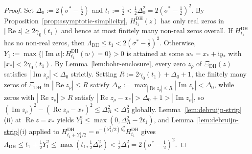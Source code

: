 \documentclass[11pt,a4paper,reqno]{amsart}
\theoremstyle{definition}
\theoremstyle{remark}
\numberwithin{equation}{section}
\newcommand{\ii}{\mathrm{i}}
\newcommand{\ee}{\mathrm{e}}
\DeclareMathOperator{\Reop}{Re}
\DeclareMathOperator{\Imop}{Im}
\begin{document}
\begin{proof}
Set $\Delta_0 := 2(\sigma^* - \frac{1}{2})$ and $t_1 := \frac{1}{2} < \frac{1}{2}\Delta_0^2 = 2(\sigma^* - \frac{1}{2})^2$. By Proposition~\ref{prop:asymptotic-simplicity}, $H_{t_1}^{\mathrm{DH}}(z)$ has only real zeros in $|\Reop z| \ge 2\gamma_0(t_1)$ and hence at most finitely many non-real zeros overall. If $H_{t_1}^{\mathrm{DH}}$ has no non-real zeros, then $\Lambda_{\mathrm{DH}} \le t_1 < 2(\sigma^* - \frac{1}{2})^2$. Otherwise, $Y_1 := \max\{|\Imop w| : H_{t_1}^{\mathrm{DH}}(w) = 0\} > 0$ is attained at some $w_* = x_* + \ii y_*$ with $|x_*| < 2\gamma_0(t_1)$. By Lemma~\ref{lem:bohr-enclosure}, every zero $z_\rho$ of $\Xi_{\mathrm{DH}}(z)$ satisfies $|\Imop z_\rho| < \Delta_0$ strictly. Setting $R := 2\gamma_0(t_1) + \Delta_0 + 1$, the finitely many zeros of $\Xi_{\mathrm{DH}}$ in $|\Reop z_\rho| \le R$ satisfy $\Delta_R := \max_{|\Reop z_\rho| \le R}|\Imop z_\rho| < \Delta_0$, while zeros with $|\Reop z_\rho| > R$ satisfy $|\Reop z_\rho - x_*| > \Delta_0 + 1 > |\Imop z_\rho|$, so $(\Imop z_\rho)^2 - (\Reop z_\rho - x_*)^2 \le \Delta_R^2 < \Delta_0^2$ globally. Lemma~\ref{lem:debruijn-strip}(ii) at $\Reop z = x_*$ yields $Y_1^2 \le \max(0, \Delta_R^2 - 2t_1)$, and Lemma~\ref{lem:debruijn-strip}(i) applied to $H_{t_1 + Y_1^2/2}^{\mathrm{DH}} = \ee^{-(Y_1^2/2)\partial_z^2}H_{t_1}^{\mathrm{DH}}$ gives $\Lambda_{\mathrm{DH}} \le t_1 + \frac{1}{2}Y_1^2 \le \max(t_1, \frac{1}{2}\Delta_R^2) < \frac{1}{2}\Delta_0^2 = 2(\sigma^* - \frac{1}{2})^2$.
\end{proof}
\end{document}
